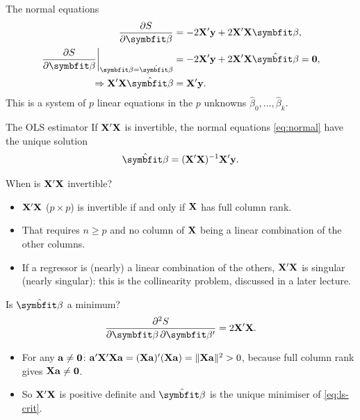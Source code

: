 \begin{frame}{The normal equations}
    \begin{align}
        \frac{\partial S}{\partial\bbeta} &= -2\bX'\by + 2\bX'\bX\bbeta, \notag\\
        \left.\frac{\partial S}{\partial\bbeta}\right|_{\bbeta = \hat{\bbeta}} &= -2\bX'\by + 2\bX'\bX\hat{\bbeta} =  \bzero, \notag\\
        \Rightarrow \bX'\bX\hat{\bbeta} &= \bX'\by. \label{eq:normal}
    \end{align}
    This is a system of $p$ linear equations in the $p$ unknowns $\hat\beta_0,\dots,\hat\beta_k$.
\end{frame}


\begin{frame}{The OLS estimator}
    If $\mathbf{X}'\mathbf{X}$ is invertible, the normal equations \eqref{eq:normal} have the unique solution
    \begin{align}
        \hat{\bbeta} = (\bX'\bX)^{-1}\bX'\by. \label{eq:ols}
    \end{align}
\end{frame}


\begin{frame}{When is $\mathbf{X}'\mathbf{X}$ invertible?}
    \begin{itemize}
        \item $\mathbf{X}'\mathbf{X}$ ($p\times p$) is invertible if and only if $\mathbf{X}$ has full column rank.
        \item That requires $n\ge p$ and no column of $\mathbf{X}$ being a linear combination of the other columns.
        \item If a regressor is (nearly) a linear combination of the others, $\mathbf{X}'\mathbf{X}$ is singular (nearly singular): this is the collinearity problem, discussed in a later lecture.
    \end{itemize}
\end{frame}


\begin{frame}{Is $\hat{\bbeta}$ a minimum?}
    \[
    \frac{\partial^2 S}{\partial\bbeta\,\partial\bbeta'} = 2\bX'\bX.
    \]
    \begin{itemize}
        \item For any $\mathbf{a}\neq\mathbf{0}$: $\mathbf{a}'\mathbf{X}'\mathbf{X}\mathbf{a} = (\mathbf{X}\mathbf{a})'(\mathbf{X}\mathbf{a}) = \|\mathbf{X}\mathbf{a}\|^2 > 0$, because full column rank gives $\mathbf{X}\mathbf{a}\neq\mathbf{0}$.
        \item So $\mathbf{X}'\mathbf{X}$ is positive definite and $\hat{\bbeta}$ is the unique minimiser of \eqref{eq:ls-crit}.
    \end{itemize}
\end{frame}


